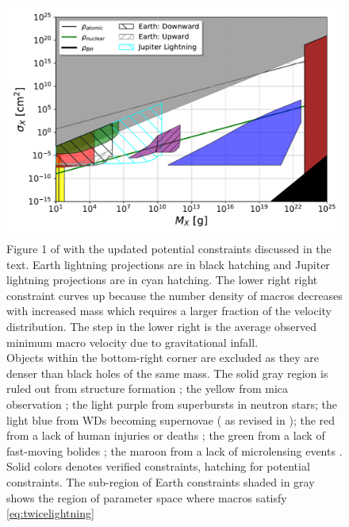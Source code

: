 \documentclass[%
 reprint,
 amsmath,amssymb,
 aps,
]{revtex4-2}
\begin{document}

\begin{figure}
    \includegraphics[width=\textwidth]{lightning_constraints/lightningconstraints.pdf}
    \caption{
        Figure 1 of \citep{Sidhu2020reconsider} with the updated potential constraints discussed in the text. Earth lightning projections are in black hatching and Jupiter lightning projections are in cyan hatching. The lower right right constraint curves up because the number density of macros decreases with increased mass which requires a larger fraction of the velocity distribution. The step in the lower right is the average observed minimum macro velocity due to gravitational infall.
        \\
        Objects within the bottom-right corner are excluded as they are denser than black holes of the same mass. The {\color{gray} solid gray} region is ruled out from structure formation \citep{Wilkinson2014angular}; the {\color{yellow} yellow} from mica observation \citep{DeRujula1984axn, Price1988ge};  the light {\color{blue} purple} from superbursts in neutron stars; the {\color{cyan} light blue} from WDs becoming supernovae (\citet{Graham2018} as revised in \citet{Sidhu2020reconsider});  the {\color{red} red} from a lack of human injuries or deaths \citep{Sidhu2019death}; the {\color{green} green} from a lack of fast-moving bolides \citep{Sidhu2019bolide}; the {\color{purple} maroon} from a lack of microlensing events \citep{Niikura2019, Alcock2001, Tisserand2007, Carr2010, Griest2013}. Solid colors denotes verified constraints, hatching for potential constraints.
        The sub-region of Earth constraints shaded in {\color{gray} gray} shows the region of parameter space where macros satisfy \eqref{eq:twicelightning}
    }\label{fig:constraints}
\end{figure}
\end{document}
